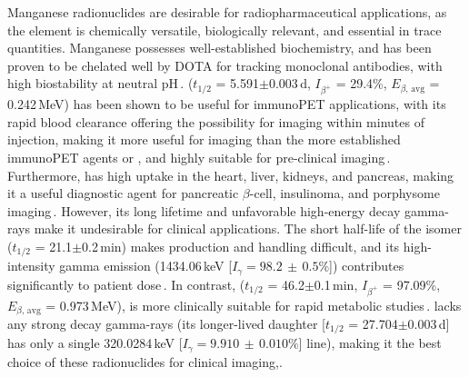 Manganese radionuclides are desirable for radiopharmaceutical applications, as 
the element is chemically versatile,  biologically relevant, and essential in trace quantities. 
Manganese possesses well-established biochemistry, and has been proven to be chelated well by DOTA for tracking monoclonal antibodies, with high biostability at neutral pH\,\cite{Graves2015}.
 ($t_{1/2}$ = 5.591$\pm$0.003\,d, $I_{\beta^+}$ = 29.4\%, $E_{\beta\text{, avg}}$ = 0.242\,MeV) has been shown to be useful for immunoPET applications, with its rapid blood clearance offering the possibility for imaging within minutes of injection,
making it more useful for imaging  than the more established immunoPET agents  or   , and highly suitable for pre-clinical imaging\,\cite{Dong2015}.  
Furthermore,   has high uptake in the heart, liver, kidneys, and pancreas, making it a useful diagnostic agent for pancreatic $\beta$-cell, insulinoma, and porphysome imaging\,\cite{Graves2015}. 
However, its  long lifetime and unfavorable high-energy decay gamma-rays 
make it undesirable for clinical applications.
The short half-life of the   isomer ($t_{1/2}$ = 21.1$\pm$0.2\,min)
makes production and handling difficult, and its  high-intensity gamma emission (1434.06\,keV [$I_\gamma = 98.2\,\pm\,0.5\%$]) contributes significantly to patient dose\,\cite{Dong2015}.
In contrast,  ($t_{1/2}$ = 46.2$\pm$0.1\,min, $I_{\beta^+}$ = 97.09\%, $E_{\beta\text{, avg}}$ = 0.973\,MeV), 
is more clinically suitable for rapid metabolic studies\,\cite{Wang2017}.
 lacks any strong decay gamma-rays (its longer-lived daughter  [$t_{1/2}$ = 27.704$\pm$0.003\,d] has only a single  320.0284\,keV [$I_\gamma = 9.910\,\pm\,0.010\%$] line), making it the best choice of these radionuclides for clinical imaging,\cite{Wang2017}.








